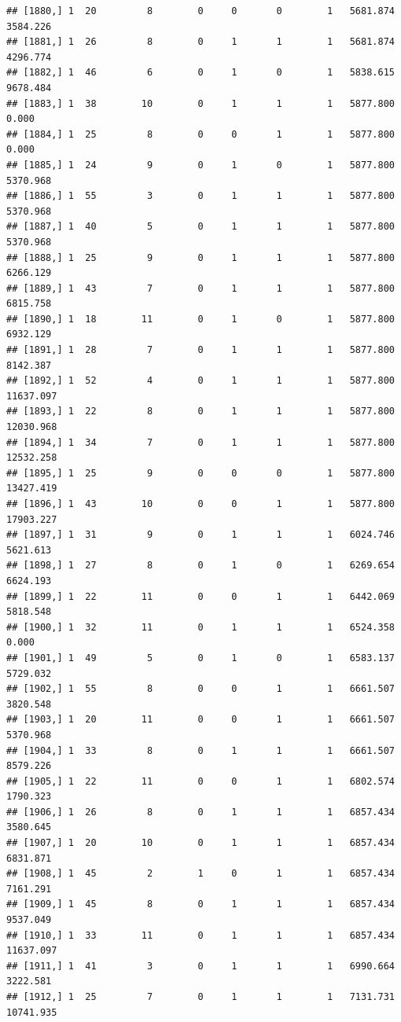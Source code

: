 \documentclass[
]{article}
\begin{document}
\begin{verbatim}
## [1880,] 1  20         8        0     0       0        1   5681.874   3584.226
## [1881,] 1  26         8        0     1       1        1   5681.874   4296.774
## [1882,] 1  46         6        0     1       0        1   5838.615   9678.484
## [1883,] 1  38        10        0     1       1        1   5877.800      0.000
## [1884,] 1  25         8        0     0       1        1   5877.800      0.000
## [1885,] 1  24         9        0     1       0        1   5877.800   5370.968
## [1886,] 1  55         3        0     1       1        1   5877.800   5370.968
## [1887,] 1  40         5        0     1       1        1   5877.800   5370.968
## [1888,] 1  25         9        0     1       1        1   5877.800   6266.129
## [1889,] 1  43         7        0     1       1        1   5877.800   6815.758
## [1890,] 1  18        11        0     1       0        1   5877.800   6932.129
## [1891,] 1  28         7        0     1       1        1   5877.800   8142.387
## [1892,] 1  52         4        0     1       1        1   5877.800  11637.097
## [1893,] 1  22         8        0     1       1        1   5877.800  12030.968
## [1894,] 1  34         7        0     1       1        1   5877.800  12532.258
## [1895,] 1  25         9        0     0       0        1   5877.800  13427.419
## [1896,] 1  43        10        0     0       1        1   5877.800  17903.227
## [1897,] 1  31         9        0     1       1        1   6024.746   5621.613
## [1898,] 1  27         8        0     1       0        1   6269.654   6624.193
## [1899,] 1  22        11        0     0       1        1   6442.069   5818.548
## [1900,] 1  32        11        0     1       1        1   6524.358      0.000
## [1901,] 1  49         5        0     1       0        1   6583.137   5729.032
## [1902,] 1  55         8        0     0       1        1   6661.507   3820.548
## [1903,] 1  20        11        0     0       1        1   6661.507   5370.968
## [1904,] 1  33         8        0     1       1        1   6661.507   8579.226
## [1905,] 1  22        11        0     0       1        1   6802.574   1790.323
## [1906,] 1  26         8        0     1       1        1   6857.434   3580.645
## [1907,] 1  20        10        0     1       1        1   6857.434   6831.871
## [1908,] 1  45         2        1     0       1        1   6857.434   7161.291
## [1909,] 1  45         8        0     1       1        1   6857.434   9537.049
## [1910,] 1  33        11        0     1       1        1   6857.434  11637.097
## [1911,] 1  41         3        0     1       1        1   6990.664   3222.581
## [1912,] 1  25         7        0     1       1        1   7131.731  10741.935

\end{verbatim}
\end{document}
